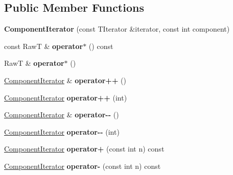 \subsection*{Public Member Functions}
\begin{DoxyCompactItemize}
\item 
\hypertarget{structComponentIterator_a2e1cc666a2eaec6287ec612145491982}{}\label{structComponentIterator_a2e1cc666a2eaec6287ec612145491982} 
{\bfseries Component\+Iterator} (const T\+Iterator \&iterator, const int component)
\item 
\hypertarget{structComponentIterator_aa11f240d815ddceb4a3fb3a7a1b3ce36}{}\label{structComponentIterator_aa11f240d815ddceb4a3fb3a7a1b3ce36} 
const RawT \& {\bfseries operator$\ast$} () const
\item 
\hypertarget{structComponentIterator_a962ddbc9f6f44f82d366257ed574bf8f}{}\label{structComponentIterator_a962ddbc9f6f44f82d366257ed574bf8f} 
RawT \& {\bfseries operator$\ast$} ()
\item 
\hypertarget{structComponentIterator_a668af983401a19b0993e6f1335f6f789}{}\label{structComponentIterator_a668af983401a19b0993e6f1335f6f789} 
\hyperlink{structComponentIterator}{Component\+Iterator} \& {\bfseries operator++} ()
\item 
\hypertarget{structComponentIterator_a4877f1587d6526925355955bc7be882b}{}\label{structComponentIterator_a4877f1587d6526925355955bc7be882b} 
\hyperlink{structComponentIterator}{Component\+Iterator} {\bfseries operator++} (int)
\item 
\hypertarget{structComponentIterator_ab8ecc1d0d6f5c8e4ce22549939daec5d}{}\label{structComponentIterator_ab8ecc1d0d6f5c8e4ce22549939daec5d} 
\hyperlink{structComponentIterator}{Component\+Iterator} \& {\bfseries operator-\/-\/} ()
\item 
\hypertarget{structComponentIterator_a30169a624479f81ff980916bb77d5515}{}\label{structComponentIterator_a30169a624479f81ff980916bb77d5515} 
\hyperlink{structComponentIterator}{Component\+Iterator} {\bfseries operator-\/-\/} (int)
\item 
\hypertarget{structComponentIterator_a63ee4d99b185e9c17b216399b09f81f4}{}\label{structComponentIterator_a63ee4d99b185e9c17b216399b09f81f4} 
\hyperlink{structComponentIterator}{Component\+Iterator} {\bfseries operator+} (const int n) const
\item 
\hypertarget{structComponentIterator_af7113fe1670b698375ae29c6307368cb}{}\label{structComponentIterator_af7113fe1670b698375ae29c6307368cb} 
\hyperlink{structComponentIterator}{Component\+Iterator} {\bfseries operator-\/} (const int n) const

\end{DoxyCompactItemize}
